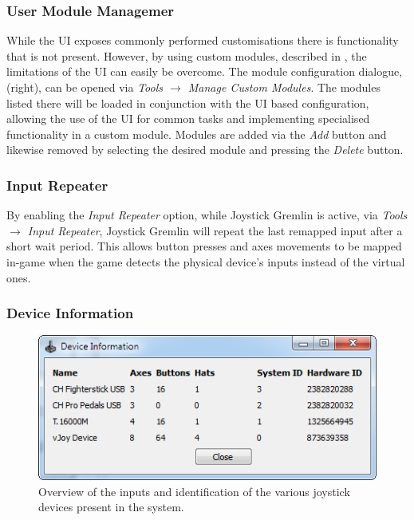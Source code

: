 \documentclass[a4, 10pt]{article}
\newcommand{\JG}{Joystick Gremlin}
\begin{document}
\subsubsection{User Module Managemer}

While the UI exposes commonly performed customisations there is
functionality that is not present. However, by using custom modules,
described in , the limitations of the UI can
easily be overcome. The module configuration dialogue,
 (right), can be opened via \emph{Tools
$\rightarrow$ Manage Custom Modules}. The modules listed there will be
loaded in conjunction with the UI based configuration, allowing the use
of the UI for common tasks and implementing specialised functionality in
a custom module. Modules are added via the \emph{Add} button and
likewise removed by selecting the desired module and pressing the
\emph{Delete} button.


\subsubsection{Input Repeater}

By enabling the \emph{Input Repeater} option, while \JG{} is active, via
\emph{Tools $\rightarrow$ Input Repeater}, \JG{} will repeat the last
remapped input after a short wait period. This allows button presses and
axes movements to be mapped in-game when the game detects the physical
device's inputs instead of the virtual ones.


\subsubsection{Device Information}

\begin{figure}[bt]
    \centering

    \includegraphics[width=0.75\linewidth]{images/device_information}
    \caption{Overview of the inputs and identification of the various
        joystick devices present in the system.}
    \label{fig:device_information}
\end{figure}
\end{document}
